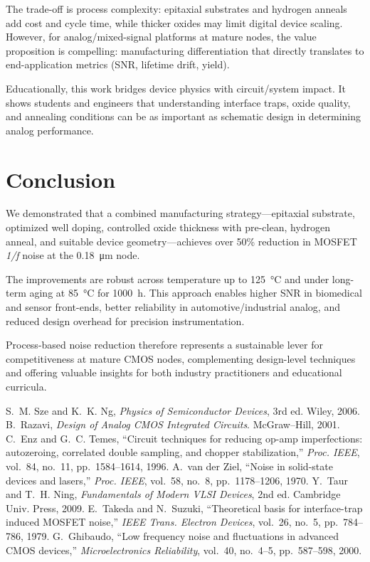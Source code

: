 \documentclass[conference]{IEEEtran}
\begin{document}
The trade-off is process complexity: epitaxial substrates and hydrogen anneals add cost and cycle time, while thicker oxides may limit digital device scaling. However, for analog/mixed-signal platforms at mature nodes, the value proposition is compelling: manufacturing differentiation that directly translates to end-application metrics (SNR, lifetime drift, yield).

Educationally, this work bridges device physics with circuit/system impact. It shows students and engineers that understanding interface traps, oxide quality, and annealing conditions can be as important as schematic design in determining analog performance.

\section{Conclusion}
We demonstrated that a combined manufacturing strategy---epitaxial substrate, optimized well doping, controlled oxide thickness with pre-clean, hydrogen anneal, and suitable device geometry---achieves over 50\% reduction in MOSFET \emph{1/f} noise at the \SI{0.18}{\micro\meter} node. 

The improvements are robust across temperature up to \SI{125}{\celsius} and under long-term aging at \SI{85}{\celsius} for 1000~h. This approach enables higher SNR in biomedical and sensor front-ends, better reliability in automotive/industrial analog, and reduced design overhead for precision instrumentation. 

Process-based noise reduction therefore represents a sustainable lever for competitiveness at mature CMOS nodes, complementing design-level techniques and offering valuable insights for both industry practitioners and educational curricula.

\begin{thebibliography}{10}
S.~M. Sze and K.~K. Ng, \emph{Physics of Semiconductor Devices}, 3rd ed. Wiley, 2006.
B.~Razavi, \emph{Design of Analog CMOS Integrated Circuits}. McGraw--Hill, 2001.
C.~Enz and G.~C. Temes, ``Circuit techniques for reducing op-amp imperfections: autozeroing, correlated double sampling, and chopper stabilization,'' \emph{Proc. IEEE}, vol.~84, no.~11, pp.~1584--1614, 1996.
A.~van der Ziel, ``Noise in solid-state devices and lasers,'' \emph{Proc. IEEE}, vol.~58, no.~8, pp.~1178--1206, 1970.
Y.~Taur and T.~H. Ning, \emph{Fundamentals of Modern VLSI Devices}, 2nd ed. Cambridge Univ. Press, 2009.
E.~Takeda and N.~Suzuki, ``Theoretical basis for interface-trap induced MOSFET noise,'' \emph{IEEE Trans. Electron Devices}, vol.~26, no.~5, pp.~784--786, 1979.
G.~Ghibaudo, ``Low frequency noise and fluctuations in advanced CMOS devices,'' \emph{Microelectronics Reliability}, vol.~40, no.~4--5, pp.~587--598, 2000.
\end{thebibliography}
\end{document}
